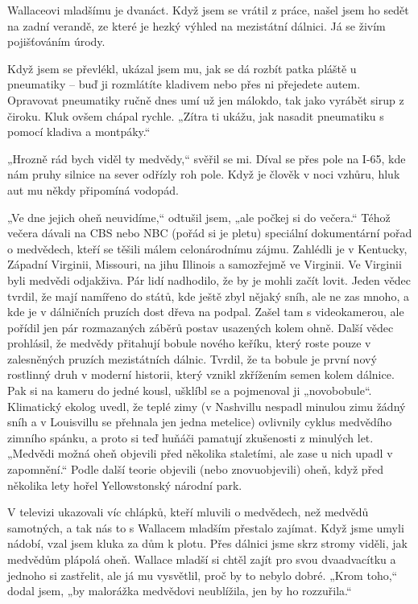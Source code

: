 Wallaceovi mladšímu je dvanáct. Když jsem se vrátil z práce, našel jsem ho sedět na zadní verandě, ze které je hezký výhled na mezistátní dálnici. Já se živím pojišťováním úrody.

Když jsem se převlékl, ukázal jsem mu, jak se dá rozbít patka pláště u pneumatiky – buď ji rozmlátíte kladivem nebo přes ni přejedete autem. Opravovat pneumatiky ručně dnes umí už jen málokdo, tak jako vyrábět sirup z čiroku. Kluk ovšem chápal rychle. „Zítra ti ukážu, jak nasadit pneumatiku s pomocí kladiva a montpáky.“

„Hrozně rád bych viděl ty medvědy,“ svěřil se mi. Díval se přes pole na I-65, kde nám pruhy silnice na sever odřízly roh pole. Když je člověk v noci vzhůru, hluk aut mu někdy připomíná vodopád.

„Ve dne jejich oheň neuvidíme,“ odtušil jsem, „ale počkej si do večera.“ Téhož večera dávali na CBS nebo NBC (pořád si je pletu) speciální dokumentární pořad o medvědech, kteří se těšili málem celonárodnímu zájmu. Zahlédli je v Kentucky, Západní Virginii, Missouri, na jihu Illinois a samozřejmě ve Virginii. Ve Virginii byli medvědi odjakživa. Pár lidí nadhodilo, že by je mohli začít lovit. Jeden vědec tvrdil, že mají namířeno do států, kde ještě zbyl nějaký sníh, ale ne zas mnoho, a kde je v dálničních pruzích dost dřeva na podpal. Zašel tam s videokamerou, ale pořídil jen pár rozmazaných záběrů postav usazených kolem ohně. Další vědec prohlásil, že medvědy přitahují bobule nového keříku, který roste pouze v zalesněných pruzích mezistátních dálnic. Tvrdil, že ta bobule je první nový rostlinný druh v moderní historii, který vznikl zkřížením semen kolem dálnice. Pak si na kameru do jedné kousl, ušklíbl se a pojmenoval ji „novobobule“. Klimatický ekolog uvedl, že teplé zimy (v Nashvillu nespadl minulou zimu žádný sníh a v Louisvillu se přehnala jen jedna metelice) ovlivnily cyklus medvědího zimního spánku, a proto si teď huňáči pamatují zkušenosti z minulých let. „Medvědi možná oheň objevili před několika staletími, ale zase u nich upadl v zapomnění.“ Podle další teorie objevili (nebo znovuobjevili) oheň, když před několika lety hořel Yellowstonský národní park.

V televizi ukazovali víc chlápků, kteří mluvili o medvědech, než medvědů samotných, a tak nás to s Wallacem mladším přestalo zajímat. Když jsme umyli nádobí, vzal jsem kluka za dům k plotu. Přes dálnici jsme skrz stromy viděli, jak medvědům plápolá oheň. Wallace mladší si chtěl zajít pro svou dvaadvacítku a jednoho si zastřelit, ale já mu vysvětlil, proč by to nebylo dobré. „Krom toho,“ dodal jsem, „by malorážka medvědovi neublížila, jen by ho rozzuřila.“

